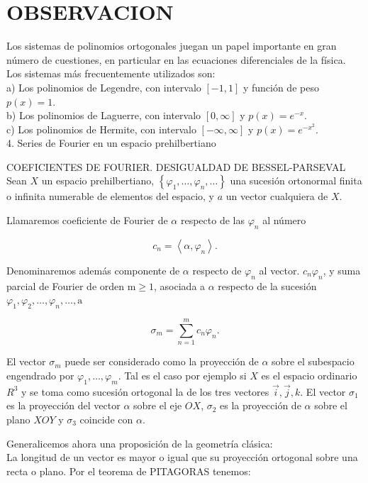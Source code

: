 \documentclass[10pt]{article}
\theoremstyle{plain}
\theoremstyle{definition}
\theoremstyle{remark}
\begin{document}
\section*{OBSERVACION}
Los sistemas de polinomios ortogonales juegan un papel importante en gran número de cuestiones, en particular en las ecuaciones diferenciales de la física. Los sistemas más frecuentemente utilizados son:\\
a) Los polinomios de Legendre, con intervalo $[-1,1]$ y función de peso $p(x)=1$.\\
b) Los polinomios de Laguerre, con intervalo $[0, \infty]$ y $p(x)=e^{-x}$.\\
c) Los polinomios de Hermite, con intervalo $[-\infty, \infty]$ y $p(x)=e^{-x^{2}}$.\\
4. Series de Fourier en un espacio prehilbertiano

COEFICIENTES DE FOURIER. DESIGUALDAD DE BESSEL-PARSEVAL\\
Sean $X$ un espacio prehilbertiano, $\left\{\varphi_{1}, \ldots, \varphi_{n}, \ldots\right\}$ una sucesión ortonormal finita o infinita numerable de elementos del espacio, y $a$ un vector cualquiera de $X$.

Llamaremos coeficiente de Fourier de $\alpha$ respecto de las $\varphi_{n}$ al número


\begin{equation*}
c_{n}=\left\langle\alpha, \varphi_{n}\right\rangle . \tag{$4\cdot1$}
\end{equation*}


Denominaremos además componente de $\alpha$ respecto de $\varphi_{n}$ al vector. $c_{n} \varphi_{n}$, y suma parcial de Fourier de orden $\mathrm{m} \geqslant 1$, asociada a $\alpha$ respecto de la sucesión $\varphi_{1}, \varphi_{2}, \ldots, \varphi_{n}, \ldots, \mathrm{a}$

$$
\sigma_{m}=\sum_{n=1}^{m} c_{n} \varphi_{n} .
$$

El vector $\sigma_{m}$ puede ser considerado como la proyección de $\alpha$ sobre el subespacio engendrado por $\varphi_{1}, \ldots, \varphi_{m}$. Tal es el caso por ejemplo si $X$ es el espacio ordinario $R^{3}$ y se toma como sucesión ortogonal la de los tres vectores $\vec{i}, \vec{j}, k$. El vector $\sigma_{1}$ es la proyección del vector $\alpha$ sobre el eje $O X$, $\sigma_{2}$ es la proyección de $\alpha$ sobre el plano $X O Y$ y $\sigma_{3}$ coincide con $\alpha$.

Generalicemos ahora una proposición de la geometría clásica:\\
La longitud de un vector es mayor o igual que su proyección ortogonal sobre una recta o plano. Por el teorema de PITAGORAS tenemos:
\end{document}
